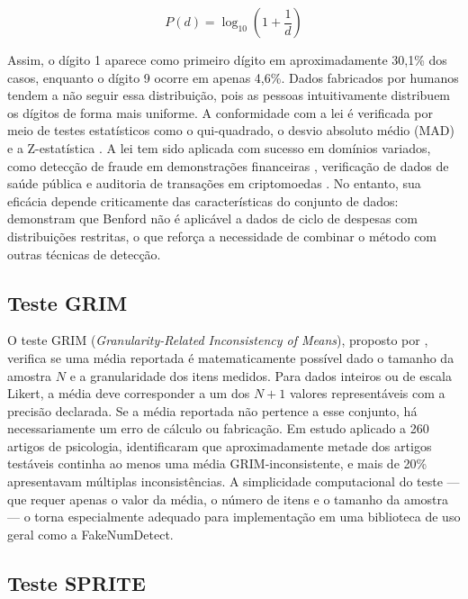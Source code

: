 \documentclass[
    12pt,                %
    openright,           %
    oneside,             %
    a4paper,             %
    english,             %
    brazil               %
]{abntex2}
\begin{document}
\begin{equation}
    P(d) = \log_{10}\!\left(1 + \frac{1}{d}\right)
\end{equation}

Assim, o dígito 1 aparece como primeiro dígito em aproximadamente 30,1\% dos casos, enquanto o dígito 9 ocorre em apenas 4,6\%. Dados fabricados por humanos tendem a não seguir essa distribuição, pois as pessoas intuitivamente distribuem os dígitos de forma mais uniforme. A conformidade com a lei é verificada por meio de testes estatísticos como o qui-quadrado, o desvio absoluto médio (MAD) e a Z-estatística \cite{Nigrini2012}.
A lei tem sido aplicada com sucesso em domínios variados, como detecção de fraude em demonstrações financeiras \cite{SameeRad2021}, verificação de dados de saúde pública \cite{Balashov2021} e auditoria de transações em criptomoedas \cite{Vicic2022}. No entanto, sua eficácia depende criticamente das características do conjunto de dados:  demonstram que Benford não é aplicável a dados de ciclo de despesas com distribuições restritas, o que reforça a necessidade de combinar o método com outras técnicas de detecção.

\subsection{Teste GRIM}

O teste GRIM (\textit{Granularity-Related Inconsistency of Means}), proposto por , verifica se uma média reportada é matematicamente possível dado o tamanho da amostra \(N\) e a granularidade dos itens medidos. Para dados inteiros ou de escala Likert, a média deve corresponder a um dos \(N + 1\) valores representáveis com a precisão declarada. Se a média reportada não pertence a esse conjunto, há necessariamente um erro de cálculo ou fabricação.
Em estudo aplicado a 260 artigos de psicologia,  identificaram que aproximadamente metade dos artigos testáveis continha ao menos uma média GRIM-inconsistente, e mais de 20\% apresentavam múltiplas inconsistências. A simplicidade computacional do teste — que requer apenas o valor da média, o número de itens e o tamanho da amostra — o torna especialmente adequado para implementação em uma biblioteca de uso geral como a FakeNumDetect.

\subsection{Teste SPRITE}
\end{document}
